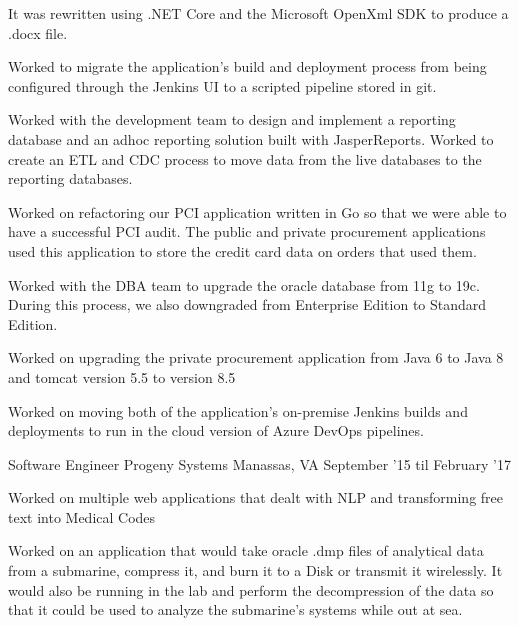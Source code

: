 \begin{cventries}
{\begin{cvitems}
{            It was rewritten using .NET Core and the Microsoft OpenXml SDK to produce a .docx file.}
        \item {Worked to migrate the application's build and deployment process from being configured 
            through the Jenkins UI to a scripted pipeline stored in git.}
        \item {Worked with the development team to design and implement a reporting database and an adhoc reporting solution built with JasperReports.
            Worked to create an ETL and CDC process to move data from the live databases to the reporting databases.}
        \item {Worked on refactoring our PCI application written in Go so that we were able to have a successful PCI audit.
            The public and private procurement applications used this application to store the credit card data on orders that used them.}
        \item {Worked with the DBA team to upgrade the oracle database from 11g to 19c. During this process,
            we also downgraded from Enterprise Edition to Standard Edition.}
        \item {Worked on upgrading the private procurement application from Java 6 to Java 8 and tomcat version 5.5 to version 8.5}
        \item {Worked on moving both of the application's on-premise Jenkins builds and deployments to run in the cloud version of Azure DevOps pipelines.}
        \end{cvitems}
    }

    \cventry
    {Software Engineer} %
    {Progeny Systems} %
    {Manassas, VA} %
    {September '15 til February '17} %
    {
        \begin{cvitems} %
        \item {Worked on multiple web applications that dealt with NLP and transforming free text into Medical Codes}
        \item {Worked on an application that would take oracle .dmp files of analytical data from a submarine,
            compress it, and burn it to a Disk or transmit it wirelessly. It would also be running in the lab 
            and perform the decompression of the data so that it could be used to analyze the submarine's systems while out at sea.}
        \end{cvitems}
    }
\end{cventries}

